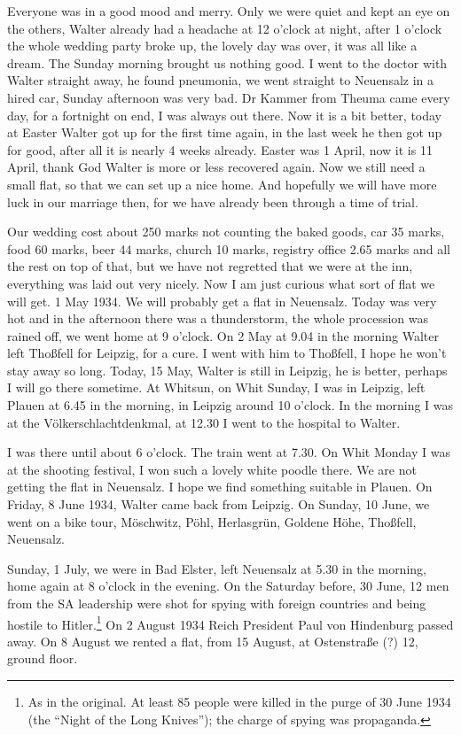 \documentclass[a5paper,11pt,openany]{book}
\newcommand{\seite}[1]{\leavevmode\marginpar{\footnotesize\itshape\raggedright #1}\ignorespaces}
\begin{document}
\seite{32}
Everyone was in a good mood and merry.
Only we were quiet and kept an eye on the others, Walter already had a headache at 12 o'clock at night,
  after 1 o'clock the whole wedding party broke up, the lovely day was over, it was all like a dream.
The Sunday morning brought us nothing good.
I went to the doctor with Walter straight away, he found pneumonia,
  we went straight to Neuensalz in a hired car, Sunday afternoon was very bad.
Dr Kammer from Theuma came every day, for a fortnight
\seite{33}
on end, I was always out there.
Now it is a bit better, today at Easter Walter got up for the first time again,
  in the last week he then got up for good,
  after all it is nearly 4 weeks already.
Easter was 1 April, now it is 11 April, thank God Walter is more or less recovered again.
Now we still need a small flat, so that we can set up a nice home.
And hopefully we will have more luck in our marriage then, for we have already been through a time of trial.

\seite{34}
Our wedding cost about 250 marks not counting the baked goods,
  car 35 marks,
  food 60 marks,
  beer 44 marks,
  church 10 marks,
  registry office 2.65 marks and all the rest on top of that, but we have not regretted that we were at the inn,
  everything was laid out very nicely.
Now I am just curious what sort of flat we will get.
1 May 1934.
We will probably get a flat in Neuensalz.
Today was very hot and in the afternoon there was a thunderstorm, the whole procession
\seite{35}
was rained off, we went home at 9 o'clock.
On 2 May at 9.04 in the morning Walter left Thoßfell for Leipzig, for a cure.
I went with him to Thoßfell, I hope he won't stay away so long.
Today, 15 May, Walter is still in Leipzig, he is better, perhaps I will go there sometime.
At Whitsun, on Whit Sunday, I was in Leipzig, left Plauen at 6.45 in the morning, in Leipzig around 10 o'clock.
In the morning I was at the Völkerschlachtdenkmal, at 12.30 I went to the hospital to Walter.

\seite{36}
I was there until about 6 o'clock.
The train went at 7.30.
On Whit Monday I was at the shooting festival, I won such a lovely white poodle there.
We are not getting the flat in Neuensalz.
I hope we find something suitable in Plauen.
On Friday, 8 June 1934, Walter came back from Leipzig.
On Sunday, 10 June, we went on a bike tour, Möschwitz, Pöhl, Herlasgrün, Goldene Höhe, Thoßfell, Neuensalz.

\seite{37}
Sunday, 1 July, we were in Bad Elster, left Neuensalz at 5.30 in the morning, home again at 8 o'clock in the evening.
On the Saturday before, 30 June, 12 men from the SA leadership were shot
  for spying with foreign countries and being hostile to Hitler.\footnote{As in the original. At least 85 people were killed in the purge of 30 June 1934 (the ``Night of the Long Knives''); the charge of spying was propaganda.}
On 2 August 1934 Reich President Paul von Hindenburg passed away.
On 8 August we rented a flat, from 15 August, at Ostenstraße (?) 12, ground floor.
\end{document}
